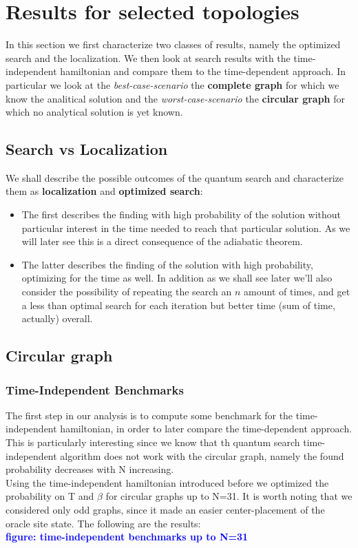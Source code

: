 \documentclass[aps,pra,reprint, onecolumn]{revtex4-2}
\newcommand{\blue}[1]{\textcolor{blue}{\textbf{figure: #1}}}
\begin{document}
\clearpage
\section{Results for selected topologies}
In this section we first characterize two classes of results, namely the optimized search and the localization. We then look at search results with the time-independent hamiltonian and compare them to the time-dependent approach. In particular we look at the \textit{best-case-scenario} the \textbf{complete graph} for which we know the analitical solution and the \textit{worst-case-scenario} the \textbf{circular graph} for which no analytical solution is yet known. 


\subsection{Search vs Localization}
We shall describe the possible outcomes of the quantum search and characterize them as \textbf{localization} and \textbf{optimized search}:
\begin{itemize}
\item The first describes the finding with high probability of the solution without particular interest in the time needed to reach that particular solution. As we will later see this is a direct consequence of the adiabatic theorem. 

\item The latter describes the finding of the solution with high probability, optimizing for the time as well. In addition as we shall see later we'll also consider the possibility of repeating the search an $n$ amount of times, and get a less than optimal search for each iteration but better time (sum of time, actually) overall.
\end{itemize}

\subsection{Circular graph}
\subsubsection{\textbf{Time-Independent Benchmarks}}
The first step in our analysis is to compute some benchmark for the time-independent hamiltonian, in order to later compare the time-dependent approach. This is particularly interesting since we know that th quantum search time-independent algorithm does not work with the circular graph, namely the found probability decreases with N increasing. \\
Using the time-independent hamiltonian introduced before we optimized the probability on T and $\beta$ for circular graphs up to N=31. It is worth noting that we considered only odd graphs, since it made an easier center-placement of the oracle site state. The following are the results:\\
\blue{time-independent benchmarks up to N=31}\\
\end{document}
